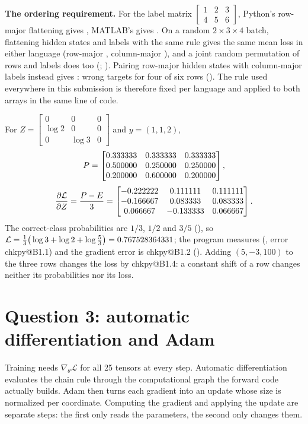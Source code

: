 \documentclass[11pt,a4paper]{article}
\makeatletter
\newcommand{\chkpy}[1]{\csname chkpy@#1\endcsname}
\numberwithin{equation}{section}
\DeclareRobustCommand{\code}[1]{\texttt{\detokenize{#1}}}
\makeatother
\begin{document}
\textbf{The ordering requirement.} For the label matrix $\begin{bmatrix}1&2&3\\4&5&6\end{bmatrix}$, Python's row-major
flattening gives \OrdPy, MATLAB's \code{Y(:)} gives \OrdMl. On a random $2\times3\times4$ batch, flattening hidden states and
labels with the same rule gives the same mean loss in either language (row-major \LOrdPy, column-major \LOrdMl), and a joint
random permutation of rows and labels does too (\LOrdPerm; \code{Q2.4}). Pairing row-major hidden states with
column-major labels instead gives \LOrdMix: wrong targets for four of six rows (\code{Q2.5}). The rule used everywhere in
this submission is therefore fixed per language and applied to both arrays in the same line of code.

\begin{result}
For $Z=\begin{bmatrix}0&0&0\\\log2&0&0\\0&\log3&0\end{bmatrix}$ and $y=(1,1,2)$,
\[
P=\begin{bmatrix}0.333333 & 0.333333 & 0.333333 \\ 0.500000 & 0.250000 & 0.250000 \\ 0.200000 & 0.600000 & 0.200000\end{bmatrix},
\]
\[
\frac{\partial\mathcal L}{\partial Z}=\frac{P-E}3=\begin{bmatrix}-0.222222 & 0.111111 & 0.111111 \\ -0.166667 & 0.083333 & 0.083333 \\ 0.066667 & -0.133333 & 0.066667\end{bmatrix} .
\]
The correct-class probabilities are $1/3$, $1/2$ and $3/5$ (\code{B1.3}), so
$\mathcal L=\tfrac13\big(\log3+\log2+\log\tfrac53\big)=0.767528364331$; the program measures \BoneL{} (\code{B1.1}, error
\chkpy{B1.1}) and the gradient error is \chkpy{B1.2} (\code{B1.2}). Adding $(5,-3,100)$ to the three rows changes the loss by
\chkpy{B1.4}: a constant shift of a row changes neither its probabilities nor its loss.
\end{result}

\section{Question 3: automatic differentiation and Adam}\label{sec:q3}

\begin{purpose}
Training needs $\nabla_\theta\mathcal L$ for all 25 tensors at every step. Automatic differentiation evaluates the chain
rule through the computational graph the forward code actually builds. Adam then turns each gradient into an update whose
size is normalized per coordinate. Computing the gradient and applying the update are separate steps: the first only
reads the parameters, the second only changes them.
\end{purpose}
\end{document}
